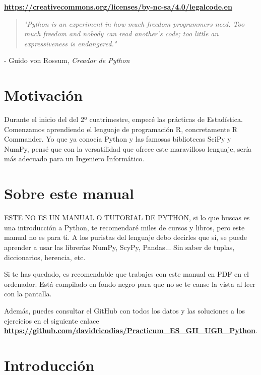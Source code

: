 \documentclass[openany,a4paper]{book}
\newcommand{\chapquote}[3]{\begin{quotation} \textit{#1} \end{quotation} \begin{flushright} - #2, \textit{#3}\end{flushright} }
\begin{document}
\textbf{\href{https://creativecommons.org/licenses/by-nc-sa/4.0/legalcode.en}{https://creativecommons.org/licenses/by-nc-sa/4.0/legalcode.en}}

\newpage

\thispagestyle{empty}

\vspace*{9cm}
\chapquote{"Python is an experiment in how much freedom programmers need. Too much freedom and nobody can read another's code; too little an expressiveness is endangered."}{Guido von Rossum}{Creador de Python}


\chapter*{Motivación}

\thispagestyle{empty}

Durante el inicio del del 2º cuatrimestre, empecé las prácticas de Estadística. Comenzamos aprendiendo el lenguaje de programación R, concretamente R Commander. Yo que ya conocía Python y las famosas bibliotecas SciPy y NumPy, pensé que con la versatilidad que ofrece este maravilloso lenguaje, sería más adecuado para un Ingeniero Informático.

\chapter*{Sobre este manual}

\thispagestyle{empty}

ESTE NO ES UN MANUAL O TUTORIAL DE PYTHON, si lo que buscas es una introducción a Python, te recomendaré miles de cursos y libros, pero este manual no es para ti. A los puristas del lenguaje debo decirles que sí, se puede aprender a usar las librerías NumPy, ScyPy, Pandas... Sin saber de tuplas, diccionarios, herencia, etc.


Si te has quedado, es recomendable que trabajes con este manual en PDF en el ordenador. Está compilado en fondo negro para que no se te canse la vista al leer con la pantalla.

Además, puedes consultar el GitHub con todos los datos y las soluciones a los ejercicios en el siguiente enlace \textbf{\href{https://github.com/davidricodias/Practicum_ES_GII_UGR_Python}{https://github.com/davidricodias/Practicum\_ES\_GII\_UGR\_Python}}.

\tableofcontents
\thispagestyle{empty}

\newpage

\chapter{Introducción}
\end{document}

